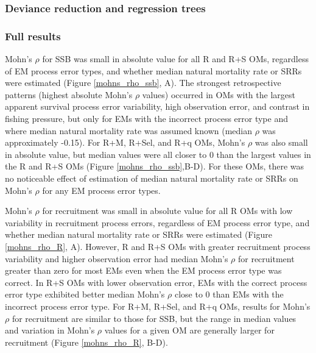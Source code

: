 \documentclass[
  12pt,
]{article}
\begin{document}
\hypertarget{deviance-reduction-and-regression-trees-1}{%
\subsubsection*{Deviance reduction and regression
trees}\label{deviance-reduction-and-regression-trees-1}}

\hypertarget{full-results-4}{%
\subsubsection*{Full results}\label{full-results-4}}

Mohn's \(\rho\) for SSB was small in absolute value for all R and R+S
OMs, regardless of EM process error types, and whether median natural
mortality rate or SRRs were estimated (Figure \ref{mohns_rho_ssb}, A).
The strongest retrospective patterns (highest absolute Mohn's \(\rho\)
values) occurred in OMs with the largest apparent survival process error
variability, high observation error, and contrast in fishing pressure,
but only for EMs with the incorrect process error type and where median
natural mortality rate was assumed known (median \(\rho\) was
approximately -0.15). For R+M, R+Sel, and R+q OMs, Mohn's \(\rho\) was
also small in absolute value, but median values were all closer to 0
than the largest values in the R and R+S OMs (Figure
\ref{mohns_rho_ssb},B-D). For these OMs, there was no noticeable effect
of estimation of median natural mortality rate or SRRs on Mohn's
\(\rho\) for any EM process error types.

Mohn's \(\rho\) for recruitment was small in absolute value for all R
OMs with low variability in recruitment process errors, regardless of EM
process error type, and whether median natural mortality rate or SRRs
were estimated (Figure \ref{mohns_rho_R}, A). However, R and R+S OMs
with greater recruitment process variability and higher observation
error had median Mohn's \(\rho\) for recruitment greater than zero for
most EMs even when the EM process error type was correct. In R+S OMs
with lower observation error, EMs with the correct process error type
exhibited better median Mohn's \(\rho\) close to 0 than EMs with the
incorrect process error type. For R+M, R+Sel, and R+q OMs, results for
Mohn's \(\rho\) for recruitment are similar to those for SSB, but the
range in median values and variation in Mohn's \(\rho\) values for a
given OM are generally larger for recruitment (Figure \ref{mohns_rho_R},
B-D).
\end{document}
